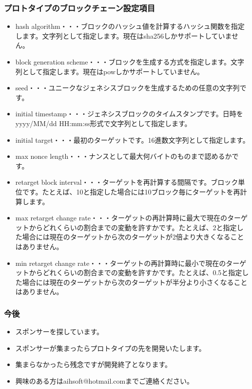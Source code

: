 \documentclass[dvipdfmx,9pt,notheorems]{beamer}
\theoremstyle{definition}
\begin{document}
\begin{frame}\frametitle{プロトタイプのブロックチェーン設定項目}
\fontsize{8pt}{0pt}\selectfont
\begin{itemize}
 \item hash algorithm・・・ブロックのハッシュ値を計算するハッシュ関数を指定します。文字列として指定します。現在はsha256しかサポートしていません。
 \item block generation scheme・・・ブロックを生成する方式を指定します。文字列として指定します。現在はpowしかサポートしていません。
 \item seed・・・ユニークなジェネシスブロックを生成するための任意の文字列です。
 \item initial timestamp・・・ジェネシスブロックのタイムスタンプです。日時をyyyy/MM/dd HH:mm:ss形式で文字列として指定します。
 \item initial target・・・最初のターゲットです。16進数文字列として指定します。
 \item max nonce length・・・ナンスとして最大何バイトのものまで認めるかです。
 \item retarget block interval・・・ターゲットを再計算する間隔です。ブロック単位です。たとえば、10と指定した場合には10ブロック毎にターゲットを再計算します。
 \item max retarget change rate・・・ターゲットの再計算時に最大で現在のターゲットからどれくらいの割合までの変動を許すかです。たとえば、2と指定した場合には現在のターゲットから次のターゲットが2倍より大きくなることはありません。
 \item min retarget change rate・・・ターゲットの再計算時に最小で現在のターゲットからどれくらいの割合までの変動を許すかです。たとえば、0.5と指定した場合には現在のターゲットから次のターゲットが半分より小さくなることはありません。
\end{itemize}
\end{frame}

\begin{frame}\frametitle{今後}
\begin{itemize}
 \item スポンサーを探しています。
 \item スポンサーが集まったらプロトタイプの先を開発いたします。
 \item 集まらなかったら残念ですが開発終了となります。
\end{itemize}
\begin{itemize}
 \item 興味のある方はaihsoft@hotmail.comまでご連絡ください。
\end{itemize}
\end{frame}
\end{document}
